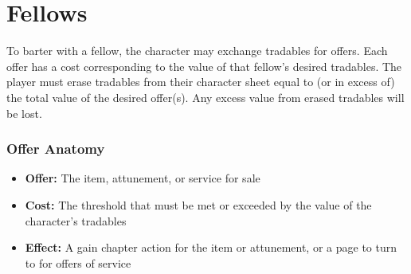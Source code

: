 \section{Fellows}
To barter with a fellow, the character may exchange tradables for offers. Each offer has a cost corresponding to the value of that fellow’s desired tradables. The player must erase tradables from their character sheet equal to (or in excess of) the total value of the desired offer(s). Any excess value from erased tradables will be lost.

\subsubsection*{Offer Anatomy}
\begin{itemize}
\item \textbf{Offer:} The item, attunement, or service for sale
\item \textbf{Cost:} The threshold that must be met or exceeded by the value of the character’s tradables
\item \textbf{Effect:} A gain chapter action for the item or attunement, or a page to turn to for offers of service
\end{itemize}


